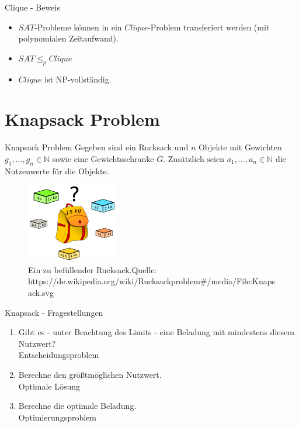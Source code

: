 \documentclass[12pt,donthandout,notes=dontshow,xcolor=table]{beamer}
\begin{document}
\begin{frame}{Clique - Beweis}
\begin{itemize}
\item \(SAT\)-Probleme können in ein \(Clique\)-Problem transferiert werden (mit polynomialen Zeitaufwand).\\
\item \(SAT \leq_p Clique\)\\
\item \(Clique\) ist NP-vollständig.
\end{itemize}
\end{frame}

\section{Knapsack Problem}
\begin{frame}{Knapsack Problem}
Gegeben sind ein Rucksack und \(n\) Objekte mit Gewichten \(g_1,...,g_n \in \mathbb{N}\) sowie eine Gewichtsschranke \(G\).
Zusätzlich seien \(a_1,...,a_n \in \mathbb{N}\) die Nutzenwerte für die Objekte. \cite{wegener}
\pause
\begin{figure}
\includegraphics[width=4cm]{figures/knapsack.png}
\caption{Ein zu befüllender Rucksack.\newline \newline \tiny Quelle: https://de.wikipedia.org/wiki/Rucksackproblem\#/media/File:Knapsack.svg}
\end{figure}
\end{frame}

\begin{frame}{Knapsack - Fragestellungen}
\begin{enumerate}
\item Gibt es - unter Beachtung des Limits - eine Beladung mit mindestens diesem Nutzwert?\\
\textrightarrow Entscheidungsproblem
\newline \pause
\item Berechne den größtmöglichen Nutzwert.\\
\textrightarrow Optimale Lösung
\newline \pause
\item Berechne die optimale Beladung.\\
\textrightarrow Optimierungsproblem
\end{enumerate}
\end{frame}
\end{document}

